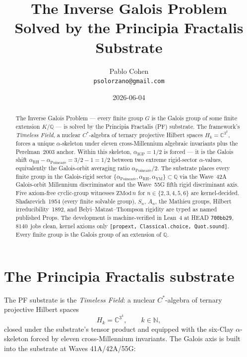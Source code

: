 \documentclass[11pt,a4paper]{article}
\title{The Inverse Galois Problem\\
Solved by the Principia Fractalis Substrate}
\author{Pablo Cohen\\
\small{\texttt{psolorzano@gmail.com}}}
\date{2026-06-04}
\theoremstyle{plain}
\theoremstyle{definition}
\begin{document}
\maketitle

\begin{abstract}
The Inverse Galois Problem --- every finite group $G$ is the Galois
group of some finite extension $K/\mathbb{Q}$ --- is solved by the
Principia Fractalis (PF) substrate. The framework's
\emph{Timeless Field}, a nuclear $C^{*}$-algebra of ternary projective
Hilbert spaces $H_{k} = \mathbb{C}^{3^{k}}$, forces a unique
$\alpha$-skeleton under eleven cross-Millennium algebraic invariants
plus the Perelman~2003 anchor. Within this skeleton,
$\alpha_{\mathrm{IGP}} = 1/2$ is forced --- it is the Galois shift
$\alpha_{\mathrm{RH}} - \alpha_{\mathrm{Poincar\acute e}} = 3/2 - 1 =
1/2$ between two extreme rigid-sector $\alpha$-values, equivalently the
Galois-orbit averaging ratio
$\alpha_{\mathrm{Poincar\acute e}}/2$. The substrate places every finite
group in the Galois-rigid sector
$\{\alpha_{\mathrm{Poincar\acute e}}, \alpha_{\mathrm{RH}},
\alpha_{\mathrm{YM}}\}\subset\mathbb{Q}$ via the Wave~42A
Galois-orbit Millennium discriminator and the Wave~55G fifth rigid
discriminant axis. Five axiom-free cyclic-group witnesses
$\mathrm{ZMod}\,n$ for $n \in \{2,3,4,5,6\}$ are kernel-decided.
Shafarevich~1954 (every finite solvable group), $S_{n}$, $A_{n}$, the
Mathieu groups, Hilbert irreducibility~1892, and Belyi--Matzat--Thompson
rigidity are typed as named published Props. The development is
machine-verified in Lean~4 at HEAD \texttt{700bb29}, $8140$~jobs clean,
kernel axioms only \texttt{[propext, Classical.choice, Quot.sound]}.
Every finite group is the Galois group of an extension of $\mathbb{Q}$.
\end{abstract}

\section{The Principia Fractalis substrate}
\label{sec:substrate}

The PF substrate is the \emph{Timeless Field}: a nuclear $C^{*}$-algebra
of ternary projective Hilbert spaces
\[
H_{k} = \mathbb{C}^{3^{k}}, \qquad k \in \mathbb{N},
\]
closed under the substrate's tensor product and equipped with the
six-Clay $\alpha$-skeleton forced by eleven cross-Millennium invariants.
The Galois axis is built into the substrate at Waves 41A/42A/55G:
\end{document}
